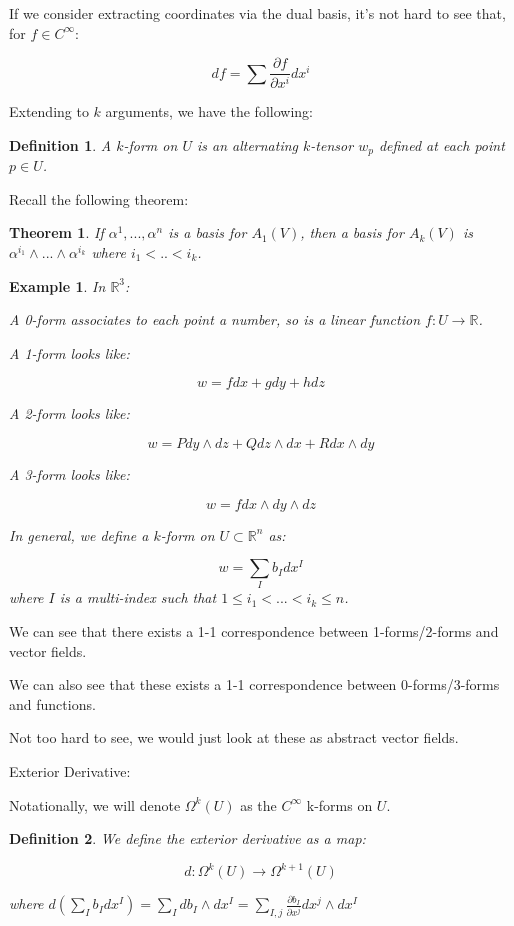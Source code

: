 \documentclass[10pt]{article}
\newtheorem{definition}{Definition}[section]
\newtheorem{theorem}{Theorem}[section]
\newtheorem{example}{Example}[section]
\begin{document}
If we consider extracting coordinates via the dual basis, it’s not hard to see that, for $f \in C^\infty$:

$$ df = \sum \frac{\partial f}{\partial x^i} dx^i $$

Extending to $k$ arguments, we have the following:

\begin{definition}
A $k$-form on $U$ is an alternating $k$-tensor $w_p$ defined at each point $p \in U$. 
\end{definition}

Recall the following theorem:

\begin{theorem}
If $\alpha^1,...,\alpha^n$ is a basis for $A_1(V)$, then a basis for $A_k(V)$ is $\alpha^{i_1} \wedge ... \wedge \alpha^{i_k}$ where $i_1 < .. < i_k$. 
\end{theorem}

\begin{example}
In $\mathbb{R}^3$:

A 0-form associates to each point a number, so is a linear function $f: U \to \mathbb{R}$. 

A 1-form looks like:

$$ w = f dx + gdy + h dz $$

A 2-form looks like:

$$ w = P dy \wedge dz + Q dz \wedge dx + R dx \wedge dy $$

A 3-form looks like:

$$ w = f dx \wedge dy \wedge dz $$

In general, we define a $k$-form on $U \subset \mathbb{R}^n$ as:

$$ w = \sum_{I} b_I dx^I$$ where $I$ is a multi-index such that $1 \leq i_1 < ... < i_k \leq n$.
\end{example} 

We can see that there exists a 1-1 correspondence between 1-forms/2-forms and vector fields.

We can also see that these exists a 1-1 correspondence between 0-forms/3-forms and functions.

Not too hard to see, we would just look at these as abstract vector fields.

Exterior Derivative:

Notationally, we will denote $\Omega^k(U)$ as the $C^\infty$ k-forms on $U$.

\begin{definition}
We define the exterior derivative as a map:

$$d: \Omega^k(U) \to \Omega^{k+1}(U)$$

where $d\left( \sum_{I} b_I dx^I \right) = \sum_I db_I \wedge dx^I = \sum_{I,j} \frac{\partial b_I}{\partial x^j} dx^j \wedge dx^I$
\end{definition}
\end{document}
